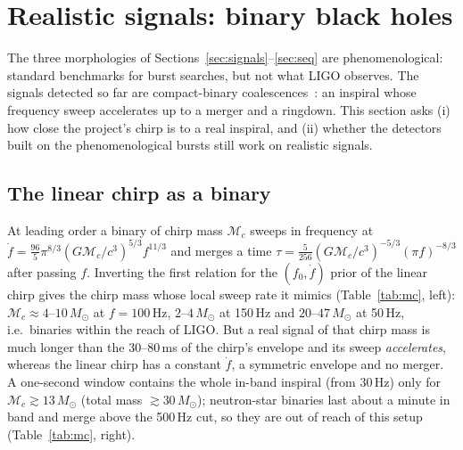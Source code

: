 \section{Realistic signals: binary black holes}\label{sec:imr}

The three morphologies of Sections~\ref{sec:signals}--\ref{sec:seq} are phenomenological: standard benchmarks for burst searches, but not what LIGO observes. The signals detected so far are compact-binary coalescences~\cite{GW150914,GW150914prop}: an inspiral whose frequency sweep accelerates up to a merger and a ringdown. This section asks (i) how close the project's chirp is to a real inspiral, and (ii) whether the detectors built on the phenomenological bursts still work on realistic signals.

\subsection{The linear chirp as a binary}
At leading order a binary of chirp mass $\mathcal M_c$ sweeps in frequency at $\dot f=\frac{96}{5}\pi^{8/3}(G\mathcal M_c/c^3)^{5/3}f^{11/3}$ and merges a time $\tau=\frac{5}{256}(G\mathcal M_c/c^3)^{-5/3}(\pi f)^{-8/3}$ after passing $f$. Inverting the first relation for the $(f_0,\dot f)$ prior of the linear chirp gives the chirp mass whose local sweep rate it mimics (Table~\ref{tab:mc}, left): $\mathcal M_c\approx4$--$10\,M_\odot$ at $f=100$\,Hz, $2$--$4\,M_\odot$ at 150\,Hz and $20$--$47\,M_\odot$ at 50\,Hz, i.e.\ binaries within the reach of LIGO. But a real signal of that chirp mass is much longer than the 30--80\,ms of the chirp's envelope and its sweep \emph{accelerates}, whereas the linear chirp has a constant $\dot f$, a symmetric envelope and no merger. A one-second window contains the whole in-band inspiral (from 30\,Hz) only for $\mathcal M_c\gtrsim13\,M_\odot$ (total mass $\gtrsim30\,M_\odot$); neutron-star binaries last about a minute in band and merge above the 500\,Hz cut, so they are out of reach of this setup (Table~\ref{tab:mc}, right).


